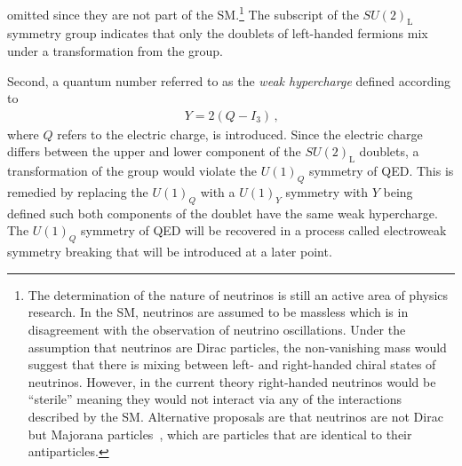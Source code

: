 omitted since they are not part of the SM.\footnote{The determination of the
  nature of neutrinos is still an active area of physics research. In the SM,
  neutrinos are assumed to be massless which is in disagreement with the
  observation of neutrino oscillations. Under the assumption that neutrinos are
  Dirac particles, the non-vanishing mass would suggest that there is mixing
  between left- and right-handed chiral states of neutrinos. However, in the
  current theory right-handed neutrinos would be ``sterile'' meaning they would
  not interact via any of the interactions described by the SM. Alternative
  proposals are that neutrinos are not Dirac but Majorana
  particles~\cite{Majorana:1937vz}, which are particles that are identical to
  their antiparticles.} The subscript of the $SU(2)_{\text{L}}$ symmetry group
indicates that only the doublets of left-handed fermions mix under a
transformation from the group.

Second, a quantum number referred to as the \emph{weak hypercharge} defined
according to
\begin{align*}
  Y = 2 (Q - I_3) \,\text{,}
\end{align*}
where $Q$ refers to the electric charge, is introduced. Since the electric
charge differs between the upper and lower component of the $SU(2)_{\text{L}}$
doublets, a transformation of the group would violate the $U(1)_Q$ symmetry of
QED. This is remedied by replacing the $U(1)_Q$ with a $U(1)_Y$ symmetry with
$Y$ being defined such both components of the doublet have the same weak
hypercharge. The $U(1)_Q$ symmetry of QED will be recovered in a process called
electroweak symmetry breaking that will be introduced at a later point.


